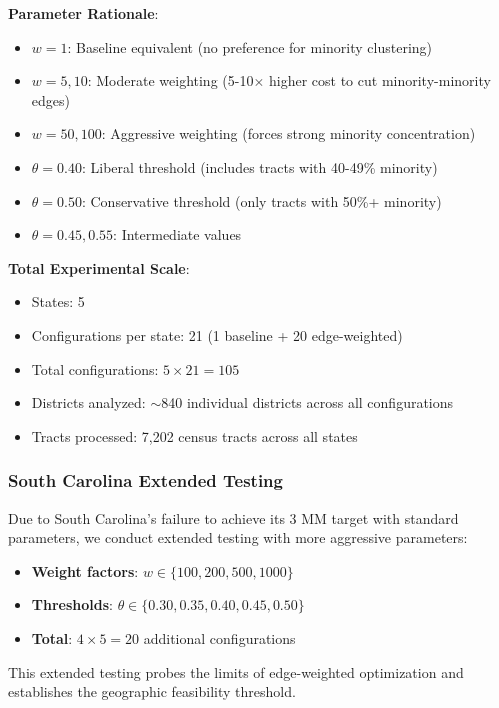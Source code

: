 \textbf{Parameter Rationale}:
\begin{itemize}
    \item \textbf{$w = 1$}: Baseline equivalent (no preference for minority clustering)
    \item \textbf{$w = 5, 10$}: Moderate weighting (5-10$\times$ higher cost to cut minority-minority edges)
    \item \textbf{$w = 50, 100$}: Aggressive weighting (forces strong minority concentration)
    \item \textbf{$\theta = 0.40$}: Liberal threshold (includes tracts with 40-49\% minority)
    \item \textbf{$\theta = 0.50$}: Conservative threshold (only tracts with 50\%+ minority)
    \item \textbf{$\theta = 0.45, 0.55$}: Intermediate values
\end{itemize}

\textbf{Total Experimental Scale}:
\begin{itemize}
    \item States: 5
    \item Configurations per state: 21 (1 baseline + 20 edge-weighted)
    \item Total configurations: $5 \times 21 = 105$
    \item Districts analyzed: $\sim$840 individual districts across all configurations
    \item Tracts processed: 7,202 census tracts across all states
\end{itemize}

\subsubsection{South Carolina Extended Testing}

Due to South Carolina's failure to achieve its 3 MM target with standard parameters, we conduct extended testing with more aggressive parameters:
\begin{itemize}
    \item \textbf{Weight factors}: $w \in \{100, 200, 500, 1000\}$
    \item \textbf{Thresholds}: $\theta \in \{0.30, 0.35, 0.40, 0.45, 0.50\}$
    \item \textbf{Total}: $4 \times 5 = 20$ additional configurations
\end{itemize}

This extended testing probes the limits of edge-weighted optimization and establishes the geographic feasibility threshold.

